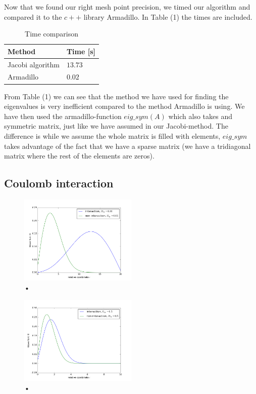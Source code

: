 \documentclass[%
 reprint,
 nobalancelastpage,
 amsmath,amssymb,
 aps,
]{revtex4-1}
\begin{document}
Now that we found our right mesh point precision, we timed our algorithm and compared it to the $c++$ library Armadillo. In Table (1) the times are included.

\begin{table}[h]
\centering
\caption{Time comparison}
\label{my-label}
\begin{tabular}{|l|l|}
\hline
\textbf{Method}  & \textbf{Time {[}s{]}} \\ \hline
Jacobi algorithm & $13.73$               \\ \hline
Armadillo        & $0.02$                \\ \hline
\end{tabular}
\end{table}

From Table (1) we can see that the method we have used for finding the eigenvalues is very inefficient compared to the method Armadillo is using. We have then used the armadillo-function $eig\_ sym(A)$ which also takes and symmetric matrix, just like we have assumed in our Jacobi-method. The difference is while we assume the whole matrix is filled with elements, $eig\_sym$ takes advantage of the fact that we have a sparse matrix (we have a tridiagonal matrix where the rest of the elements are zeros).

\subsection{Coulomb interaction}


 \begin{figure}[h]
\centering
\includegraphics[width=0.5\textwidth]{../omega001.png}
\caption{•}
\label{fig:my_label}
\end{figure}

 \begin{figure}[h]
\centering
\includegraphics[width=0.5\textwidth]{../omega05.png}
\caption{•}
\label{fig:my_label}
\end{figure}
\end{document}
